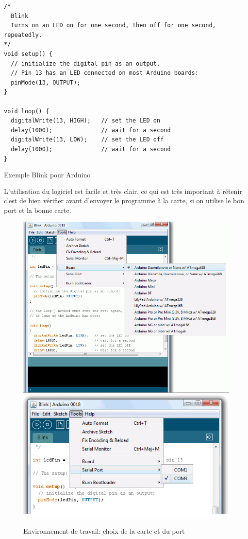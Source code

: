 \begin{table}[h]
\begin{lstlisting}
/*
  Blink
  Turns on an LED on for one second, then off for one second, repeatedly.
*/
void setup() {
  // initialize the digital pin as an output.
  // Pin 13 has an LED connected on most Arduino boards:
  pinMode(13, OUTPUT);
}

void loop() {
  digitalWrite(13, HIGH);   // set the LED on
  delay(1000);              // wait for a second
  digitalWrite(13, LOW);    // set the LED off
  delay(1000);              // wait for a second
}
\end{lstlisting}
\caption{Exemple Blink pour Arduino}
\end{table}

L'utilisation du logiciel est facile et très clair, ce qui est très important à rétenir c'est de bien vérifier avant d'envoyer le programme à la carte,
si on utilise le bon port et la bonne carte.

\begin{figure}[h]
\begin{center}
 \includegraphics[scale=0.3]{../images/Arduino/logiciel.png}
\includegraphics[scale=0.5]{../images/Arduino/logiciel1.png}
\caption{Environnement de travail: choix de la carte et du port}
\end{center}
\end{figure}

